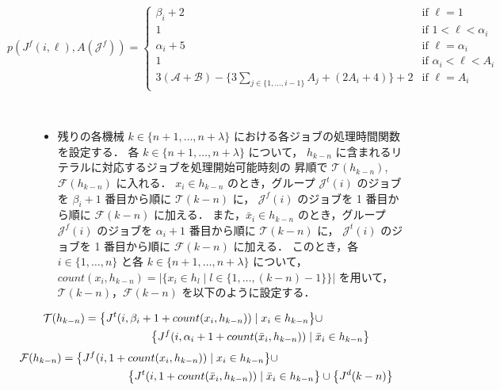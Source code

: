 \documentclass[12pt]{optlab-bachelor}
\begin{document}
\begin{displaymath}
  p(J^f(i,\ell),A(\mathcal{J}^f)) = \left\{ \begin{array}{lllll}
  \beta_i + 2 & \text{if } \ell = 1 \\
  1 & \text{if } 1 < \ell < \alpha_i \\ \alpha_i
  + 5 & \text{if } \ell = \alpha_i  \\ 1 & \text{if } \alpha_i < \ell < A_i \\ 3(\mathcal{A} + \mathcal{B}) -
  \big\{ 3\!\!\!\!\!\displaystyle \sum_{j \in \{1,\ldots,i - 1\}}\!\!\!\!\!A_j
  + (2A_i + 4)\big \} + 2 & \text{if }
  \ell = A_i \end{array} \right.
\end{displaymath}

\begin{description}
  \item[] ~
  \begin{itemize}
    \item 残りの各機械 $k \in \{n + 1, \ldots , n + \lambda\}$ における各ジョブの処理時間関数を設定する．
    各 $k \in \{n + 1, \ldots , n + \lambda\}$ について，
    $h_{k - n}$ に含まれるリテラルに対応するジョブを処理開始可能時刻の
    昇順で $\mathcal{T}(h_{k - n})$, $\mathcal{F}(h_{k - n})$ に入れる．
    $x_i \in h_{k - n}$ のとき，グループ $\mathcal{J}^t(i)$ のジョブを
    $\beta_i + 1$ 番目から順に $\mathcal{T}(k - n)$ に，
    $\mathcal{J}^f(i)$ のジョブを 1 番目から順に $\mathcal{F}(k - n)$ に加える．
    また，$\bar x_i \in h_{k - n}$ のとき，グループ $\mathcal{J}^f(i)$
    のジョブを $\alpha_i + 1$ 番目から順に $\mathcal{T}(k - n)$ に，
    $\mathcal{J}^t(i)$ のジョブを 1 番目から順に $\mathcal{F}(k - n)$ に加える．
    このとき，各 $i \in \{1,\ldots,n\}$ と各 $k \in \{n + 1, \ldots,n + \lambda\}$ について，$count(x_i,h_{k - n}) = \big|\big\{x_i \in h_l \mid l \in \{1,\ldots,(k - n) - 1\}\big\}\big|$ を用いて，$\mathcal{T}(k - n)$，$\mathcal{F}(k - n)$ を以下のように設定する．
  \end{itemize}
\end{description}
\begin{equation}
  \begin{split}
    \mathcal{T}(h_{k - n}) &= \big\{J^t(i,\beta_i + 1 +
    count(x_i,h_{k - n})) \mid x_i \in h_{k - n}\big\} \cup \\ &\qquad \qquad\qquad \big\{J^f(i,\alpha_i + 1 + count(\bar x_i, h_{k - n})) \mid \bar x_i \in h_{k - n}\big\} \notag
  \end{split}
\end{equation}
\begin{equation}
  \begin{split}
    \mathcal{F}(h_{k - n}) &= \big\{J^f(i,1 + count(
    x_i,h_{k - n})) \mid x_i \in h_{k - n} \big\} \cup \\ &\qquad\qquad\qquad \big\{J^t(i,1 + count(\bar x_i,h_{k - n})) \mid \bar x_i \in h_{k - n}\big\}  \cup \big\{J^d(k - n)\big\} \notag
  \end{split}
\end{equation}
\end{document}
